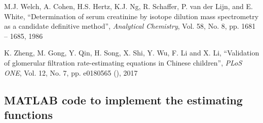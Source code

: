 \documentclass[10pt,final]{siamltex}
\begin{document}
\begin{thebibliography}{99}
   M.J. Welch, A. Cohen, H.S. Hertz, K.J. Ng, R. Schaffer, P. van der Lijn, and E. White, ``Determination of serum creatinine by isotope dilution mass spectrometry as a candidate definitive method'', \textit{Analytical Chemistry}, Vol. 58, No. 8, pp. 1681 -- 1685, 1986

   K. Zheng, M. Gong, Y. Qin, H. Song, X. Shi, Y. Wu, F. Li and X. Li, ``Validation of glomerular filtration rate-estimating equations in Chinese children'', \textit{PLoS ONE}, Vol. 12, No. 7, pp. e0180565 (), 2017
\end{thebibliography}

\begin{appendix}
  \section{MATLAB code to implement the estimating functions}
  
  
  
\end{appendix}
\end{document}
